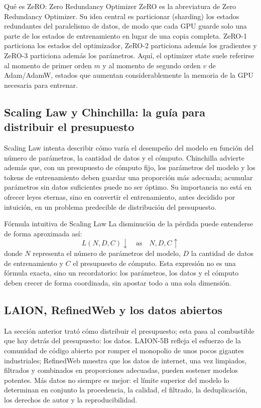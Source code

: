\begin{importantbox}{Qué es ZeRO: Zero Redundancy Optimizer}
ZeRO es la abreviatura de Zero Redundancy Optimizer. Su idea central es particionar (sharding) los estados redundantes del paralelismo de datos, de modo que cada GPU guarde solo una parte de los estados de entrenamiento en lugar de una copia completa. ZeRO-1 particiona los estados del optimizador, ZeRO-2 particiona además los gradientes y ZeRO-3 particiona además los parámetros. Aquí, el optimizer state suele referirse al momento de primer orden \(m\) y al momento de segundo orden \(v\) de Adam/AdamW, estados que aumentan considerablemente la memoria de la GPU necesaria para entrenar.
\end{importantbox}

\subsection{Scaling Law y Chinchilla: la guía para distribuir el presupuesto}

Scaling Law intenta describir cómo varía el desempeño del modelo en función del número de parámetros, la cantidad de datos y el cómputo. Chinchilla advierte además que, con un presupuesto de cómputo fijo, los parámetros del modelo y los tokens de entrenamiento deben guardar una proporción más adecuada; acumular parámetros sin datos suficientes puede no ser óptimo. Su importancia no está en ofrecer leyes eternas, sino en convertir el entrenamiento, antes decidido por intuición, en un problema predecible de distribución del presupuesto.

\begin{knowledgebox}{Fórmula intuitiva de Scaling Law}
La disminución de la pérdida puede entenderse de forma aproximada así:
\[
L(N, D, C) \downarrow \quad \text{as} \quad N,D,C \uparrow
\]
donde \(N\) representa el número de parámetros del modelo, \(D\) la cantidad de datos de entrenamiento y \(C\) el presupuesto de cómputo. Esta expresión no es una fórmula exacta, sino un recordatorio: los parámetros, los datos y el cómputo deben crecer de forma coordinada, sin apostar todo a una sola dimensión.
\end{knowledgebox}

\subsection{LAION, RefinedWeb y los datos abiertos}

La sección anterior trató cómo distribuir el presupuesto; esta pasa al combustible que hay detrás del presupuesto: los datos. LAION-5B refleja el esfuerzo de la comunidad de código abierto por romper el monopolio de unos pocos gigantes industriales; RefinedWeb muestra que los datos de internet, una vez limpiados, filtrados y combinados en proporciones adecuadas, pueden sostener modelos potentes. Más datos no siempre es mejor: el límite superior del modelo lo determinan en conjunto la procedencia, la calidad, el filtrado, la deduplicación, los derechos de autor y la reproducibilidad.


